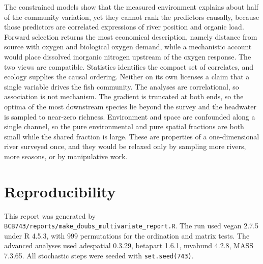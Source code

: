 \documentclass[11pt]{article}
\begin{document}
The constrained models show that the measured environment explains about half of the community variation, yet they cannot rank the predictors causally, because those predictors are correlated expressions of river position and organic load. Forward selection returns the most economical description, namely distance from source with oxygen and biological oxygen demand, while a mechanistic account would place dissolved inorganic nitrogen upstream of the oxygen response. The two views are compatible. Statistics identifies the compact set of correlates, and ecology supplies the causal ordering. Neither on its own licenses a claim that a single variable drives the fish community.
The analyses are correlational, so association is not mechanism. The gradient is truncated at both ends, so the optima of the most downstream species lie beyond the survey and the headwater is sampled to near-zero richness. Environment and space are confounded along a single channel, so the pure environmental and pure spatial fractions are both small while the shared fraction is large. These are properties of a one-dimensional river surveyed once, and they would be relaxed only by sampling more rivers, more seasons, or by manipulative work.
\section{Reproducibility}
This report was generated by \texttt{BCB743/reports/make\_doubs\_multivariate\_report.R}. The run used \textsf{vegan} 2.7.5 under R 4.5.3, with 999 permutations for the ordination and matrix tests. The advanced analyses used \textsf{adespatial} 0.3.29, \textsf{betapart} 1.6.1, \textsf{mvabund} 4.2.8, \textsf{MASS} 7.3.65. All stochastic steps were seeded with \texttt{set.seed(743)}.
\end{document}
